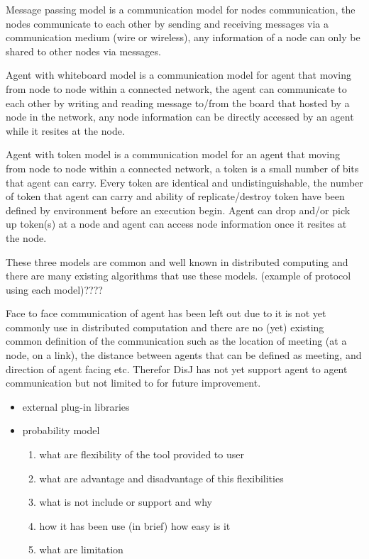 Message passing model is a communication model for nodes communication, the nodes communicate to each other by sending and receiving messages via a communication medium (wire or wireless), any information of a node can only be shared to other nodes via messages.

Agent with whiteboard model is a communication model for agent that moving from node to node within a connected network, the agent can communicate to each other by writing and reading message to/from the board that hosted by a node in the network, any node information can be directly accessed by an agent while it resites at the node.

Agent with token model is a communication model for an agent that moving from node to node within a connected network, a token is a small number of bits that agent can carry. Every token are identical and undistinguishable, the number of token that agent can carry and ability of replicate/destroy token have been defined by environment before an execution begin. Agent can drop and/or pick up token(s) at a node and agent can access node information once it resites at the node.

These three models are common and well known in distributed computing and there are many existing algorithms that use these models. (example of protocol using each model)????

Face to face communication of agent has been left out due to it is not yet commonly use in distributed computation and there are no (yet) existing common definition of the communication such as the location of meeting (at a node, on a link), the distance between agents that can be defined as meeting, and direction of agent facing etc. Therefor DisJ has not yet support agent to agent communication but not limited to for future improvement.

\begin{itemize}
\item external plug-in libraries
\item probability model
    \begin{enumerate}
    \item what are flexibility of the tool provided to user
    \item what are advantage and disadvantage of this flexibilities
    \item what is not include or support and why
    \item how it has been use (in brief) how easy is it
    \item what are limitation
    \end{enumerate}
\end{itemize}


